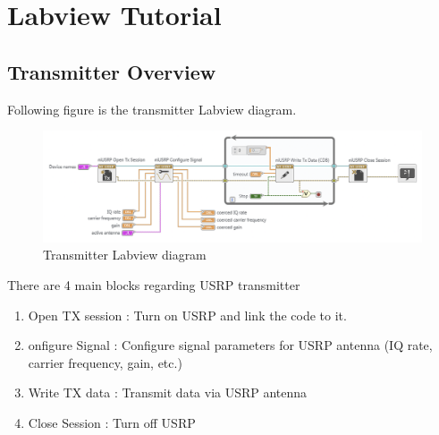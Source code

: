\section{Labview Tutorial }
\subsection{Transmitter Overview}
    Following figure is the transmitter Labview diagram. \\
    \vspace{-4mm}  
    \begin{figure}[!h]\raggedleft
    \hspace{15mm}
		\includegraphics[width=.8\textwidth]{image/week03/2-1-1.png}
		\caption{\footnotesize Transmitter Labview diagram}
		\vspace{-10pt}
    \end{figure}
    
    There are 4 main blocks regarding USRP transmitter
    \begin{enumerate}
        \item Open TX session : Turn on USRP and link the code to it. 
        \item onfigure Signal : Configure signal parameters for USRP antenna (IQ rate, carrier frequency, gain, etc.)
        \item Write TX data : Transmit data via USRP antenna
        \item Close Session : Turn off USRP
    \end{enumerate}
